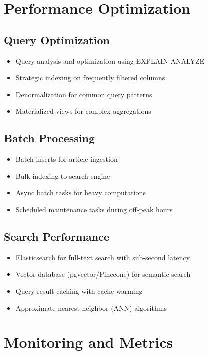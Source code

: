 \documentclass[12pt,a4paper]{report}
\begin{document}
\section{Performance Optimization}

\subsection{Query Optimization}

\begin{itemize}[label=\textbullet]
    \item Query analysis and optimization using EXPLAIN ANALYZE
    \item Strategic indexing on frequently filtered columns
    \item Denormalization for common query patterns
    \item Materialized views for complex aggregations
\end{itemize}

\subsection{Batch Processing}

\begin{itemize}[label=\textbullet]
    \item Batch inserts for article ingestion
    \item Bulk indexing to search engine
    \item Async batch tasks for heavy computations
    \item Scheduled maintenance tasks during off-peak hours
\end{itemize}

\subsection{Search Performance}

\begin{itemize}[label=\textbullet]
    \item Elasticsearch for full-text search with sub-second latency
    \item Vector database (pgvector/Pinecone) for semantic search
    \item Query result caching with cache warming
    \item Approximate nearest neighbor (ANN) algorithms
\end{itemize}

\section{Monitoring and Metrics}
\end{document}
